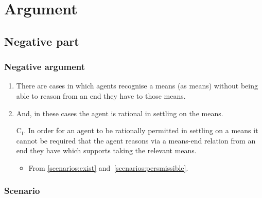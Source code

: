 \documentclass[noamssymb, compress, handout]{beamer} %
\begin{document}
\section{Argument}
\label{sec:argument}


\subsection{Negative part}
\label{sec:negative}

\begin{frame}
  \frametitle{Negative argument}

  \begin{enumerate}
  \item\label{scenarios:exist} There are cases in which agents recognise a means (as means) without being able to reason from an end they have to those means.
  \item\label{scenarios:persmissible} And, in these cases the agent is rational in settling on the means.

  \item[C\(_{\text{I}}\).]\label{scenario:no-reasoning} In order for an agent to be rationally permitted in settling on a means it cannot be required that the agent reasons via a means-end relation from an end they have which supports taking the relevant means.

  \begin{itemize}
  \item From \ref{scenarios:exist} and~\ref{scenarios:persmissible}.
  \end{itemize}
  \end{enumerate}
\end{frame}

\subsubsection{Scenario}
\label{sec:case}
\end{document}
